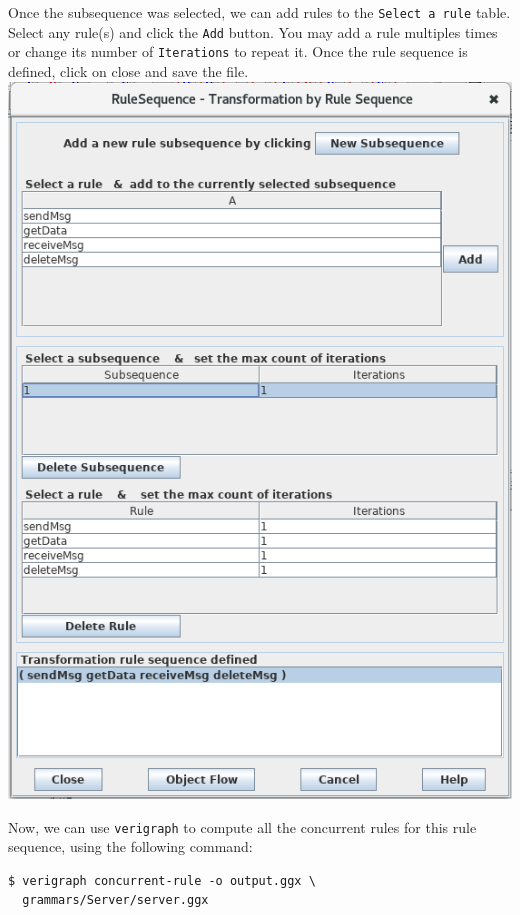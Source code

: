 \documentclass[12pt]{article}
\newenvironment{tutorialstep}
	{\hspace{-\parindent}\begin{minipage}{\textwidth}}
    {\vspace{.3cm}\end{minipage}}
\begin{document}
\begin{tutorialstep}

  Once the subsequence was selected, we can add rules to the \texttt{Select a rule} table. Select any rule(s) and click the \texttt{Add} button. You may add a rule multiples times or change its number of \texttt{Iterations} to repeat it. Once the rule sequence is defined, click on close and save the file.\\

  \noindent
  \centering
  \includegraphics[scale = 0.6]{img/concurrent-rules/rule-sequence_03.png}\\
\end{tutorialstep}

Now, we can use \texttt{verigraph} to compute all the concurrent rules for this rule sequence, using the following command:

\begin{verbatim}
$ verigraph concurrent-rule -o output.ggx \
  grammars/Server/server.ggx
\end{verbatim}
\end{document}
